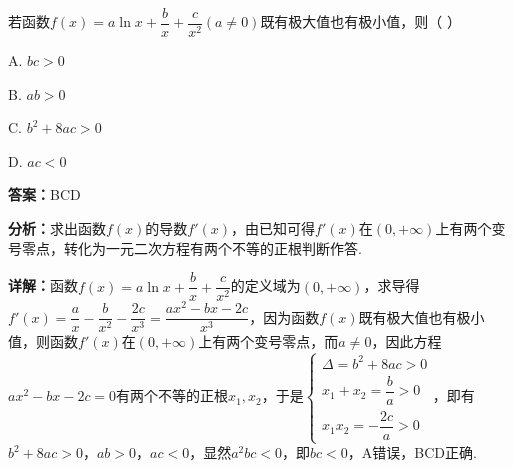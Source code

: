 \begin{question}[points=5]
若函数$f(x)=a\ln x+\dfrac{b}{x}+\dfrac{c}{x^{2}}(a\neq0)$既有极大值也有极小值，则（ \quad ）
\begin{choices}
  \item A. $bc>0$
  \item B. $ab>0$
  \item C. $b^{2}+8ac>0$
  \item D. $ac<0$
\end{choices}
\begin{solution}
\textbf{答案：}BCD

\textbf{分析：}求出函数$f(x)$的导数$f'(x)$，由已知可得$f'(x)$在$(0,+\infty)$上有两个变号零点，转化为一元二次方程有两个不等的正根判断作答.

\textbf{详解：}函数$f(x)=a\ln x+\dfrac{b}{x}+\dfrac{c}{x^{2}}$的定义域为$(0,+\infty)$，求导得$f'(x)=\dfrac{a}{x}-\dfrac{b}{x^{2}}-\dfrac{2c}{x^{3}}=\dfrac{ax^{2}-bx-2c}{x^{3}}$，因为函数$f(x)$既有极大值也有极小值，则函数$f'(x)$在$(0,+\infty)$上有两个变号零点，而$a\neq0$，因此方程$ax^{2}-bx-2c=0$有两个不等的正根$x_{1},x_{2}$，于是$\begin{cases}\Delta=b^{2}+8ac>0\\ x_{1}+x_{2}=\dfrac{b}{a}>0\\ x_{1}x_{2}=-\dfrac{2c}{a}>0\end{cases}$，即有$b^{2}+8ac>0$，$ab>0$，$ac<0$，显然$a^{2}bc<0$，即$bc<0$，A错误，BCD正确.
\end{solution}
\end{question}

